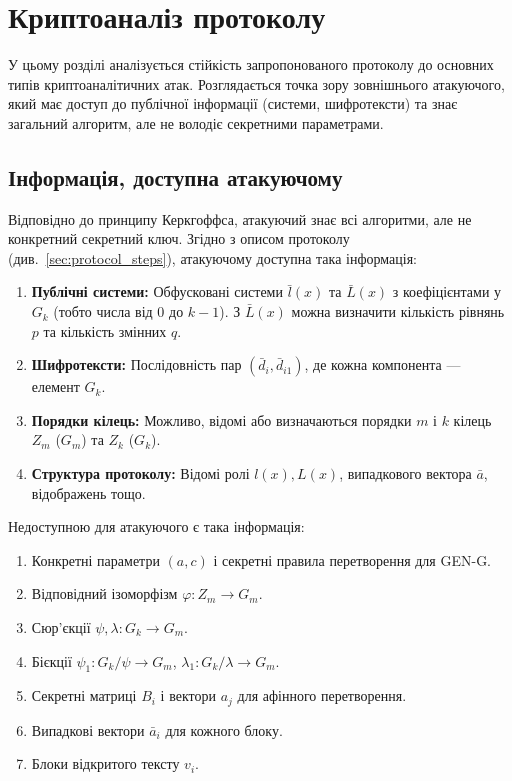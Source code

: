 \section{Криптоаналіз протоколу}
\label{sec:protocol_cryptanalysis}
У цьому розділі аналізується стійкість запропонованого протоколу до основних типів криптоаналітичних атак.
Розглядається точка зору зовнішнього атакуючого, який має доступ до публічної інформації (системи, шифротексти) та знає загальний алгоритм, але не володіє секретними параметрами.

\subsection{Інформація, доступна атакуючому}
\label{subsec:attacker_knowledge}
Відповідно до принципу Керкгоффса, атакуючий знає всі алгоритми, але не конкретний секретний ключ.
Згідно з описом протоколу (див.~\ref{sec:protocol_steps}), атакуючому доступна така інформація:
\begin{enumerate}
    \item \textbf{Публічні системи:} Обфусковані системи $\bar{l}(x)$ та $\bar{L}(x)$ з коефіцієнтами у $G_k$ (тобто числа від $0$ до $k-1$). З $\bar{L}(x)$ можна визначити кількість рівнянь $p$ та кількість змінних $q$.
    \item \textbf{Шифротексти:} Послідовність пар $(\bar{d}_i, \bar{d}_{i1})$, де кожна компонента — елемент $G_k$.
    \item \textbf{Порядки кілець:} Можливо, відомі або визначаються порядки $m$ і $k$ кілець $Z_m$ ($G_m$) та $Z_k$ ($G_k$).
    \item \textbf{Структура протоколу:} Відомі ролі $l(x), L(x)$, випадкового вектора $\bar{a}$, відображень тощо.
\end{enumerate}
Недоступною для атакуючого є така інформація:
\begin{enumerate}
    \item Конкретні параметри $(a, c)$ і секретні правила перетворення для GEN-G.
    \item Відповідний ізоморфізм $\varphi: Z_m \to G_m$.
    \item Сюр'єкції $\psi, \lambda: G_k \to G_m$.
    \item Бієкції $\psi_1: G_k/\psi \to G_m$, $\lambda_1: G_k/\lambda \to G_m$.
    \item Секретні матриці $B_i$ і вектори $a_j$ для афінного перетворення.
    \item Випадкові вектори $\bar{a}_i$ для кожного блоку.
    \item Блоки відкритого тексту $v_i$.
\end{enumerate}

